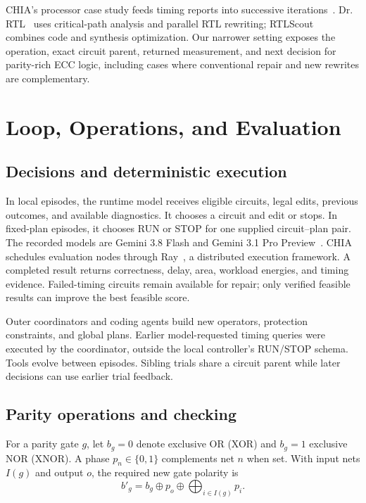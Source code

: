 \documentclass[conference,10pt]{IEEEtran}
\begin{document}


CHIA's processor case study feeds timing reports into successive iterations~\cite[Sec.~5.3]{chia}. Dr. RTL~\cite{drrtl} uses critical-path analysis and parallel RTL rewriting; RTLScout~\cite{rtlscout} combines code and synthesis optimization. Our narrower setting exposes the operation, exact circuit parent, returned measurement, and next decision for parity-rich ECC logic, including cases where conventional repair and new rewrites are complementary.



\section{Loop, Operations, and Evaluation}
\subsection{Decisions and deterministic execution}

In local episodes, the runtime model receives eligible circuits, legal edits, previous outcomes, and available diagnostics. It chooses a circuit and edit or stops. In fixed-plan episodes, it chooses RUN or STOP for one supplied circuit--plan pair. The recorded models are Gemini 3.8 Flash and Gemini 3.1 Pro Preview~\cite{gemini}. CHIA schedules evaluation nodes through Ray~\cite{ray}, a distributed execution framework. A completed result returns correctness, delay, area, workload energies, and timing evidence. Failed-timing circuits remain available for repair; only verified feasible results can improve the best feasible score.

Outer coordinators and coding agents build new operators, protection constraints, and global plans. Earlier model-requested timing queries were executed by the coordinator, outside the local controller's RUN/STOP schema. Tools evolve between episodes. Sibling trials share a circuit parent while later decisions can use earlier trial feedback.

\subsection{Parity operations and checking}

For a parity gate $g$, let $b_g=0$ denote exclusive OR (XOR) and $b_g=1$ exclusive NOR (XNOR). A phase $p_n\in\{0,1\}$ complements net $n$ when set. With input nets $I(g)$ and output $o$, the required new gate polarity is
\begin{equation}
 b'_g=b_g\oplus p_o\oplus\bigoplus_{i\in I(g)}p_i.
 \label{eq:phase}
\end{equation}
\end{document}
